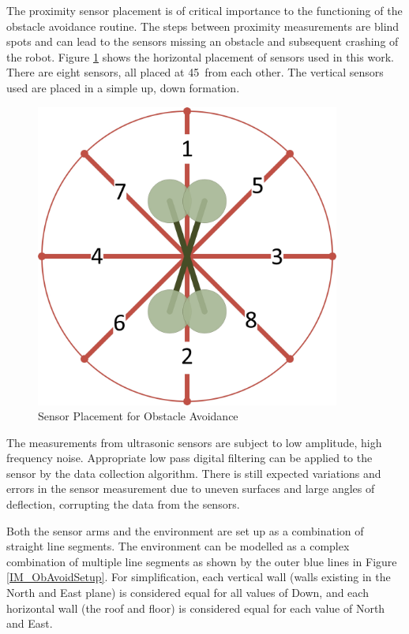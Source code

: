 		The proximity sensor placement is of critical importance to the functioning of the obstacle avoidance routine. The steps between proximity measurements are blind spots and can lead to the sensors missing an obstacle and subsequent crashing of the robot. Figure \ref{IM_SensorPlacement} shows the horizontal placement of sensors used in this work. There are eight sensors, all placed at 45\textdegree\, from each other. The vertical sensors used are placed in a simple up, down formation.
		
		\begin{figure}[H]
			\centering
			\includegraphics[height = 10cm]{../References/Diagrams/SensorPlacement.jpg}     
			\caption{Sensor Placement for Obstacle Avoidance}
			\label{IM_SensorPlacement}
		\end{figure}
		
		
		The measurements from ultrasonic sensors are subject to low amplitude, high frequency noise. Appropriate low pass digital filtering can be applied to the sensor by the data collection algorithm. There is still expected variations and errors in the sensor measurement due to uneven surfaces and large angles of deflection, corrupting the data from the sensors.
		
		Both the sensor arms and the environment are set up as a combination of straight line segments. The environment can be modelled as a complex combination of multiple line segments as shown by the outer blue lines in Figure \ref{IM_ObAvoidSetup}. For simplification, each vertical wall (walls existing in the North and East plane) is considered equal for all values of Down, and each horizontal wall (the roof and floor) is considered equal for each value of North and East. 
		
